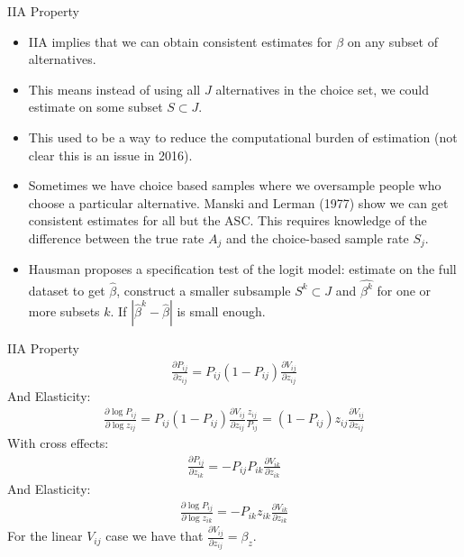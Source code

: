 \documentclass[xcolor=pdftex,dvipsnames,table,mathserif]{beamer}
\begin{document}
\begin{frame}{IIA Property}
\begin{itemize}
\item IIA implies that we can obtain consistent estimates for $\beta$ on any subset of alternatives.
\item This means instead of using all $J$ alternatives in the choice set, we could estimate on some subset $S \subset J$.
\item This used to be a way to reduce the computational burden of estimation (not clear this is an issue in 2016).
\item Sometimes we have \alert{choice based samples} where we oversample people who choose a particular alternative. Manski and Lerman (1977) show we can get consistent estimates for all but the ASC. This requires knowledge of the difference between the true rate $A_j$ and the choice-based sample rate $S_j$.
\item Hausman proposes a specification test of the logit model: estimate on the full dataset to get $\hat{\beta}$, construct a smaller subsample $S^k \subset J$ and $\hat{\beta^k}$ for one or more subsets $k$. If $|\hat{\beta}^k - \hat{\beta}|$ is small enough.
\end{itemize}
\end{frame}

\begin{frame}{IIA Property}
\begin{eqnarray*}
\frac{\partial P_{ij}}{\partial z_{ij}} = P_{ij}(1- P_{ij}) \frac{\partial V_{ij}}{\partial z_{ij}}
\end{eqnarray*}
And Elasticity:
\begin{eqnarray*}
\frac{ \partial \log P_{ij}}{ \partial \log z_{ij}} = P_{ij}(1- P_{ij}) \frac{\partial V_{ij}}{\partial z_{ij}} \frac{z_{ij}}{P_{ij}} = (1- P_{ij}) z_{ij} \frac{\partial V_{ij}}{\partial z_{ij}}
\end{eqnarray*}
With cross effects:
\begin{eqnarray*}
\frac{\partial P_{ij}}{\partial z_{ik}} = -P_{ij} P_{ik} \frac{\partial V_{ik}}{\partial z_{ik}}
\end{eqnarray*}
And Elasticity:
\begin{eqnarray*}
\frac{ \partial \log P_{ij}}{ \partial \log z_{ik}} = -P_{ik} z_{ik} \frac{\partial V_{ik}}{\partial z_{ik}}
\end{eqnarray*}
For the linear $V_{ij}$ case we have that $\frac{\partial V_{ij}}{\partial z_{ij}}=  \beta_z$.
\end{frame}
\end{document}
